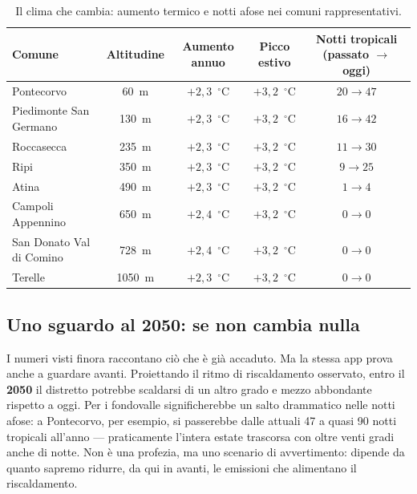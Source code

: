 \documentclass[11pt,a4paper]{article}
\newcommand{\gradi}{$^{\circ}$C}
\begin{document}
\begin{table}[H]
\centering
\caption{Il clima che cambia: aumento termico e notti afose nei comuni rappresentativi.}
\label{tab:comuni}
\renewcommand{\arraystretch}{1.25}
\begin{tabularx}{\textwidth}{Y C C C C}
\toprule
\textbf{Comune} & \textbf{Altitudine} & \textbf{Aumento annuo} & \textbf{Picco estivo} & \textbf{Notti tropicali (passato $\rightarrow$ oggi)} \\
\midrule
Pontecorvo & \SI{60}{\meter} & $+2{,}3$~\gradi & $+3{,}2$~\gradi & $20 \rightarrow 47$ \\
Piedimonte San Germano & \SI{130}{\meter} & $+2{,}3$~\gradi & $+3{,}2$~\gradi & $16 \rightarrow 42$ \\
Roccasecca & \SI{235}{\meter} & $+2{,}3$~\gradi & $+3{,}2$~\gradi & $11 \rightarrow 30$ \\
Ripi & \SI{350}{\meter} & $+2{,}3$~\gradi & $+3{,}2$~\gradi & $9 \rightarrow 25$ \\
Atina & \SI{490}{\meter} & $+2{,}3$~\gradi & $+3{,}2$~\gradi & $1 \rightarrow 4$ \\
Campoli Appennino & \SI{650}{\meter} & $+2{,}4$~\gradi & $+3{,}2$~\gradi & $0 \rightarrow 0$ \\
San Donato Val di Comino & \SI{728}{\meter} & $+2{,}4$~\gradi & $+3{,}2$~\gradi & $0 \rightarrow 0$ \\
Terelle & \SI{1050}{\meter} & $+2{,}3$~\gradi & $+3{,}2$~\gradi & $0 \rightarrow 0$ \\
\bottomrule
\end{tabularx}
\end{table}

\subsection{Uno sguardo al 2050: se non cambia nulla}
I numeri visti finora raccontano ciò che è già accaduto. Ma la stessa app prova anche a guardare avanti. Proiettando il ritmo di riscaldamento osservato, entro il \textbf{2050} il distretto potrebbe scaldarsi di un altro grado e mezzo abbondante rispetto a oggi. Per i fondovalle significherebbe un salto drammatico nelle notti afose: a Pontecorvo, per esempio, si passerebbe dalle attuali \num{47} a quasi \num{90} notti tropicali all'anno --- praticamente l'intera estate trascorsa con oltre venti gradi anche di notte. Non è una profezia, ma uno scenario di avvertimento: dipende da quanto sapremo ridurre, da qui in avanti, le emissioni che alimentano il riscaldamento.
\end{document}
